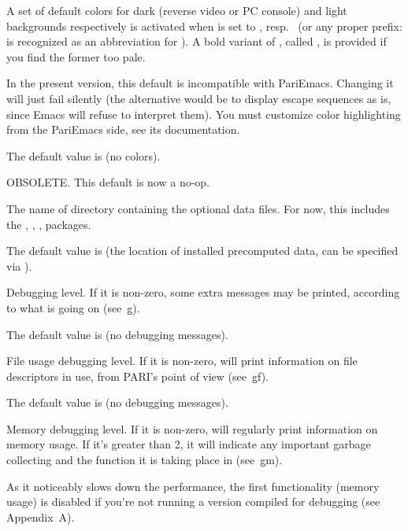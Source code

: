 {A set of default colors for dark (reverse video or PC console) and light
backgrounds respectively is activated when  is set to
, resp.~ (or any proper prefix:  is
recognized as an abbreviation for ). A bold variant of
, called , is provided if you find the former too
pale.

\emacs In the present version, this default is incompatible with PariEmacs.
Changing it will just fail silently (the alternative would be to display
escape sequences as is, since Emacs will refuse to interpret them).
You must customize color highlighting from the PariEmacs side, see its
documentation.

The default value is  (no colors).

\label{se:def,compatible}
OBSOLETE. This default is now a no-op.

\label{se:def,datadir}
The name of directory containing the optional data files. For now,
this includes the , , , 
packages.

The default value is \datadir (the location of installed precomputed data,
can be specified via ).

\label{se:def,debug}
Debugging level. If it is non-zero, some extra messages may be printed,
according to what is going on (see~\b{g}).

The default value is  (no debugging messages).

\label{se:def,debugfiles}
File usage debugging level. If it is non-zero,  will print
information on file descriptors in use, from PARI's point of view
(see~\b{gf}).

The default value is  (no debugging messages).

\label{se:def,debugmem}
Memory debugging level. If it is non-zero,  will regularly print
information on memory usage. If it's greater than 2, it will indicate any
important garbage collecting and the function it is taking place in
(see~\b{gm}).

 As it noticeably slows down the performance,
the first functionality (memory usage) is disabled if you're not running a
version compiled for debugging (see Appendix~A).

}
